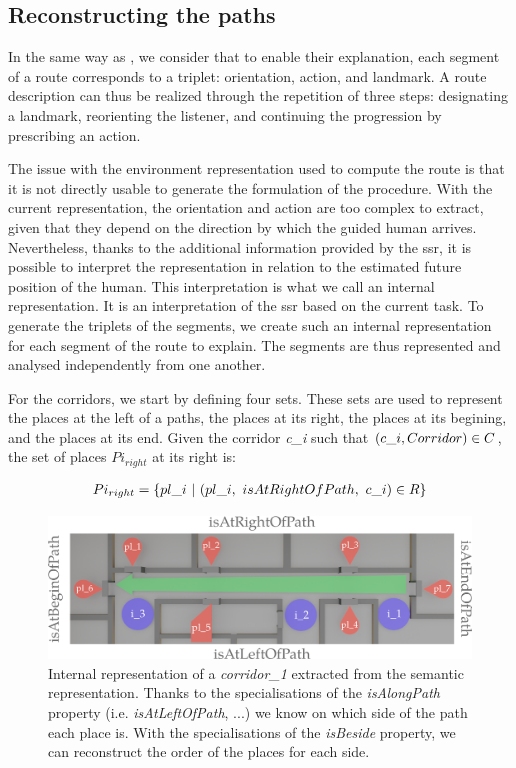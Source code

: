 \subsection{Reconstructing the paths}

In the same way as \cite{tversky_1999_pictorial}, we consider that to enable their explanation, each segment of a route corresponds to a triplet: orientation, action, and landmark. A route description can thus be realized through the repetition of three steps: designating a landmark, reorienting the listener, and continuing the progression by prescribing an action.

The issue with the environment representation used to compute the route is that it is not directly usable to generate the formulation of the procedure. With the current representation, the orientation and action are too complex to extract, given that they depend on the direction by which the guided human arrives. Nevertheless, thanks to the additional information provided by the \acrlong{ssr}, it is possible to interpret the representation in relation to the estimated future position of the human. This interpretation is what we call an internal representation. It is an interpretation of the \acrshort{ssr} based on the current task. To generate the triplets of the segments, we create such an internal representation for each segment of the route to explain. The segments are thus represented and analysed independently from one another.

For the corridors, we start by defining four sets. These sets are used to represent the places at the left of a paths, the places at its right, the places at its begining, and the places at its end. Given the corridor \textit{c\_i} such that $(c\_i, Corridor) \in C$, the set of places $Pi_{right}$ at its right is:

\begin{gather*}
Pi_{right} = \{ pl\_i\ |\ (pl\_i,\ isAtRightOfPath,\ c\_i) \in R \}
\end{gather*}

\begin{figure}[h!]
\centering
\includegraphics[width=\textwidth]{figures/chapter3/corridor.png}
\caption{\label{fig:chap3_corridor} Internal representation of a \textit{corridor\_1} extracted from the semantic representation. Thanks to the specialisations of the \textit{isAlongPath} property (i.e. \textit{isAtLeftOfPath}, ...) we know on which side of the path each place is. With the specialisations of the \textit{isBeside} property, we can reconstruct the order of the places for each side. }
\end{figure}

